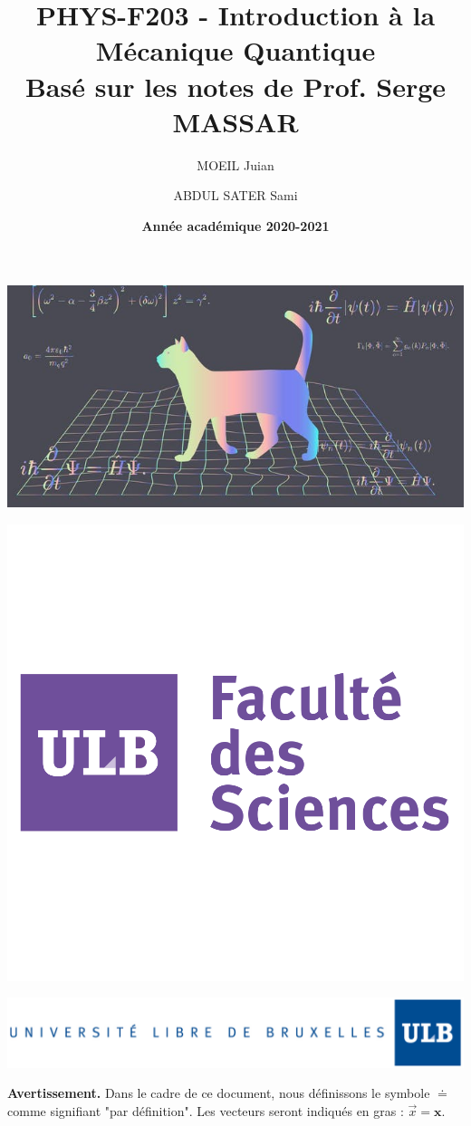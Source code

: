 \documentclass[a4paper]{article}
\title{\textbf{PHYS-F203 - Introduction à la Mécanique Quantique} \\ Basé sur les notes de Prof. Serge MASSAR}
\author{MOEIL Juian \and ABDUL SATER Sami}
\date{\textbf{Année académique 2020-2021}}
\numberwithin{equation}{part}
\begin{document}
\maketitle
\begin{center}
\includegraphics[scale=0.65]{Images/cat.jpg}
\end{center}
\begin{center}
\includegraphics[scale=0.20]{Images/sciences.png}
\end{center}
\begin{center}
\includegraphics[scale=0.45]{Images/ULB.jpg}
\end{center}

\newpage
\textbf{Avertissement.} Dans le cadre de ce document, nous définissons le symbole $\doteq$ comme signifiant "par définition". Les vecteurs seront indiqués en gras : $\vec{x} = \bm{x}$.
\tableofcontents

\newpage

\newpage

\newpage

\newpage

\newpage

\newpage


\newpage

\end{document}
